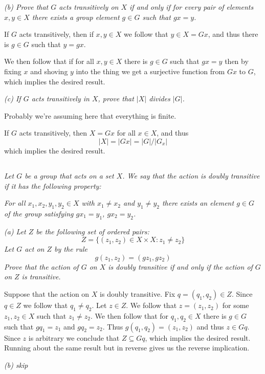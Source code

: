 \documentclass[11pt,oneside,titlepage]{book}
\newcommand{\set}[1]{\{ #1 \}}
\begin{document}
\textit{(b) Prove that $G$ acts transitively on $X$ if and only if for
  every pair of elements $x, y \in X$ there exists a group element $g \in G$
  such that $gx = y$.}

If $G$ acts transitively, then if $x, y \in X$ we follow that $y \in X = Gx$,
and thus there is $g \in G$ such that $y = gx$.

We then follow that if for all $x, y \in X$ there is $g \in G$ such that
$gx = y$ then by fixing $x$ and shoving $y$ into the thing we get a
surjective function from $Gx$ to $G$, which implies the desired result.

\textit{(c) If $G$ acts transitively in $X$, prove that $|X|$ divides
  $|G|$.}

Probably we're assuming here that everything is finite.

If $G$ acts transitively, then $X = Gx$ for all $x \in X$, and thus
$$|X| = |Gx| = |G| / |G_x|$$
which implies the desired result.

\subsection{}

\textit{Let $G$ be a group that acts on a set $X$. We say that the
  action is doubly transitive if it has the following property: }

\textit{For all $x_1, x_2, y_1, y_2 \in X$ with $x_1 \neq x_2$ and
  $y_1 \neq y_2$ there exists an element $g \in G$ of the group
  satisfying $g x_1 = y_1$, $g x_2 = y_2$. }


\textit{(a) Let $Z$ be the following set of ordered pairs:
  $$Z = \set{(z_1, z_2) \in X \times X: z_1 \neq z_2}$$
  Let $G$ act on $Z$ by the rule
  $$g(z_1, z_2) = (gz_1, gz_2)$$
  Prove that the action of $G$ on $X$ is doubly transitive if and only
  if the action of $G$ on $Z$ is transitive.
}

Suppose that the action on $X$ is doubly transitive. Fix $q = (q_1,
q_2) \in Z$. Since $q \in Z$ we follow that $q_1 \neq q_2$.  Let $z
\in Z$. We follow that $z = (z_1, z_2)$ for some $z_1, z_2 \in X$ such
that $z_1 \neq z_2$. We then follow that for $q_1, q_2 \in X$ there is
$g \in G$ such that $gq_1 = z_1$ and $gq_2 = z_2$.  Thus
$g(q_1, q_2) = (z_1, z_2)$ and thus $z \in Gq$. Since $z$ is arbitrary
we conclude that $Z \subseteq Gq$, which implies the desired result.
Running about the same result but in reverse gives us the reverse
implication.

\textit{(b) skip}
\end{document}
